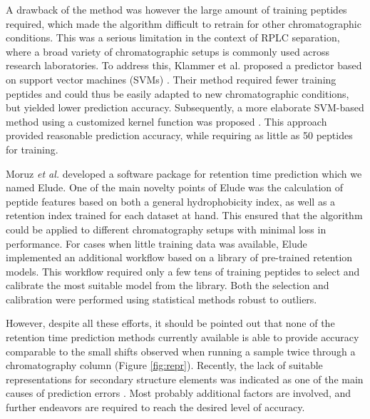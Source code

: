 \documentclass[a4paper]{article}
\begin{document}
A drawback of the method was however the large amount of training
peptides required, which made the algorithm difficult to retrain for
other chromatographic conditions. This was a serious limitation in the
context of RPLC separation, where a broad variety of chromatographic
setups is commonly used across research laboratories. To address this,
Klammer et al. proposed a predictor based on support vector machines
(SVMs) \cite{klammer2007improving}. Their method required fewer
training peptides and could thus be easily adapted to new
chromatographic conditions, but yielded lower prediction
accuracy. Subsequently, a more elaborate SVM-based method using a
customized kernel function was proposed \cite{rtpredict, rtpredictImproved}. This
approach provided reasonable prediction accuracy, while requiring as
little as 50 peptides for training.




Moruz {\em et al.} \cite{elude1} developed a software package for
retention time prediction which we named {\sc Elude}. One of the main
novelty points of {\sc Elude} was the calculation of peptide features
based on both a general hydrophobicity index, as well as a retention
index trained for each dataset at hand. This ensured that the
algorithm could be applied to different chromatography setups with
minimal loss in performance. For cases when little training data was
available, {\sc Elude} implemented an additional workflow based on a
library of pre-trained retention models. This workflow required only a
few tens of training peptides to select and calibrate the most
suitable model from the library. Both the selection and calibration
were performed using statistical methods robust to outliers.



However, despite all these efforts, it should be pointed out that none
of the retention time prediction methods currently available is able
to provide accuracy comparable to the small shifts observed when
running a sample twice through a chromatography column
(Figure \ref{fig:repr}). Recently, the lack of suitable
representations for secondary structure elements was indicated as one
of the main causes of prediction errors \cite{Reimer2012}.  Most
probably additional factors are involved, and further endeavors are
required to reach the desired level of accuracy.
\end{document}
